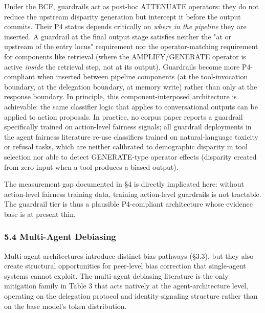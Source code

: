\documentclass[10pt]{article}
\begin{document}
Under the BCF, guardrails act as post-hoc ATTENUATE operators: they do not reduce the upstream disparity generation but intercept it before the output commits. Their P4 status depends critically on \emph{where in the pipeline} they are inserted. A guardrail at the final output stage satisfies neither the "at or upstream of the entry locus" requirement nor the operator-matching requirement for components like retrieval (where the AMPLIFY/GENERATE operator is active \emph{inside} the retrieval step, not at its output). Guardrails become more P4-compliant when inserted between pipeline components (at the tool-invocation boundary, at the delegation boundary, at memory write) rather than only at the response boundary. In principle, this component-interposed architecture is achievable: the same classifier logic that \cite{dong2024building} applies to conversational outputs can be applied to action proposals. In practice, no corpus paper reports a guardrail specifically trained on action-level fairness signals; all guardrail deployments in the agent fairness literature re-use classifiers trained on natural-language toxicity or refusal tasks, which are neither calibrated to demographic disparity in tool selection nor able to detect GENERATE-type operator effects (disparity created from zero input when a tool produces a biased output).

The measurement gap documented in \S{}4 is directly implicated here: without action-level fairness training data, training action-level guardrails is not tractable. The guardrail tier is thus a plausible P4-compliant architecture whose evidence base is at present thin.

\subsubsection*{5.4 Multi-Agent Debiasing}

Multi-agent architectures introduce distinct bias pathways (\S{}3.3), but they also create structural opportunities for peer-level bias correction that single-agent systems cannot exploit. The multi-agent debiasing literature is the only mitigation family in Table 3 that acts natively at the agent-architecture level, operating on the delegation protocol and identity-signaling structure rather than on the base model's token distribution.
\end{document}
